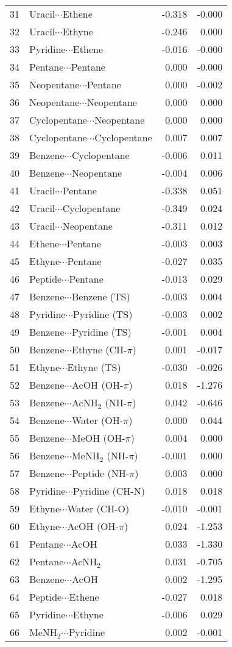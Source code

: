\begin{longtable}{llrr}
31 & Uracil$\cdots$Ethene & -0.318 & -0.000 \\
32 & Uracil$\cdots$Ethyne & -0.246 & 0.000 \\
33 & Pyridine$\cdots$Ethene & -0.016 & -0.000 \\
34 & Pentane$\cdots$Pentane & 0.000 & -0.000 \\
35 & Neopentane$\cdots$Pentane & 0.000 & -0.002 \\
36 & Neopentane$\cdots$Neopentane & 0.000 & 0.000 \\
37 & Cyclopentane$\cdots$Neopentane & 0.000 & 0.000 \\
38 & Cyclopentane$\cdots$Cyclopentane & 0.007 & 0.007 \\
39 & Benzene$\cdots$Cyclopentane & -0.006 & 0.011 \\
40 & Benzene$\cdots$Neopentane & -0.004 & 0.006 \\
41 & Uracil$\cdots$Pentane & -0.338 & 0.051 \\
42 & Uracil$\cdots$Cyclopentane & -0.349 & 0.024 \\
43 & Uracil$\cdots$Neopentane & -0.311 & 0.012 \\
44 & Ethene$\cdots$Pentane & -0.003 & 0.003 \\
45 & Ethyne$\cdots$Pentane & -0.027 & 0.035 \\
46 & Peptide$\cdots$Pentane & -0.013 & 0.029 \\
47 & Benzene$\cdots$Benzene (TS) & -0.003 & 0.004 \\
48 & Pyridine$\cdots$Pyridine (TS) & -0.003 & 0.002 \\
49 & Benzene$\cdots$Pyridine (TS) & -0.001 & 0.004 \\
50 & Benzene$\cdots$Ethyne (CH-$\pi$) & 0.001 & -0.017 \\
51 & Ethyne$\cdots$Ethyne (TS) & -0.030 & -0.026 \\
52 & Benzene$\cdots$AcOH (OH-$\pi$) & 0.018 & -1.276 \\
53 & Benzene$\cdots$AcNH$_2$ (NH-$\pi$) & 0.042 & -0.646 \\
54 & Benzene$\cdots$Water (OH-$\pi$) & 0.000 & 0.044 \\
55 & Benzene$\cdots$MeOH (OH-$\pi$) & 0.004 & 0.000 \\
56 & Benzene$\cdots$MeNH$_2$ (NH-$\pi$) & -0.001 & 0.000 \\
57 & Benzene$\cdots$Peptide (NH-$\pi$) & 0.003 & 0.000 \\
58 & Pyridine$\cdots$Pyridine (CH-N) & 0.018 & 0.018 \\
59 & Ethyne$\cdots$Water (CH-O) & -0.010 & -0.001 \\
60 & Ethyne$\cdots$AcOH (OH-$\pi$) & 0.024 & -1.253 \\
61 & Pentane$\cdots$AcOH & 0.033 & -1.330 \\
62 & Pentane$\cdots$AcNH$_2$ & 0.031 & -0.705 \\
63 & Benzene$\cdots$AcOH & 0.002 & -1.295 \\
64 & Peptide$\cdots$Ethene & -0.027 & 0.018 \\
65 & Pyridine$\cdots$Ethyne & -0.006 & 0.029 \\
66 & MeNH$_2$$\cdots$Pyridine & 0.002 & -0.001 \\
\end{longtable}